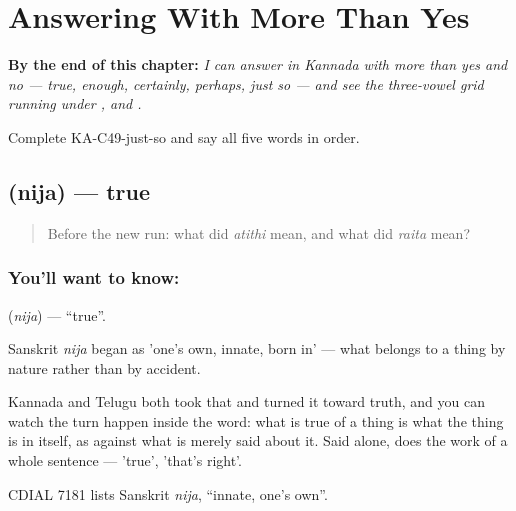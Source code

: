 
\chapter{Answering With More Than Yes}
\label{ch:ka-replies}

\begin{chapteropening}
\textbf{By the end of this chapter:} \emph{I can answer in Kannada with more than yes and no --- true, enough, certainly, perhaps, just so --- and see the three-vowel grid running under ,  and .}

Complete KA-C49-just-so and say all five words in order.
\end{chapteropening}

\section[\texorpdfstring{\kn{ನಿಜ} (nija)}{ನಿಜ (nija)}]{ (nija) — true}

\label{lesson:KA-C49-true}



\begin{quote}
Before the new run: what did \emph{atithi} mean, and what did \emph{raita} mean?
\end{quote}

\subsection*{You'll want to know: }
\textbf{} (\emph{nija}) — \textquotedblleft{}true\textquotedblright{}.

Sanskrit \emph{nija} began as 'one's own, innate, born in' — what belongs to a thing by nature rather than by accident.

Kannada and Telugu both took that and turned it toward truth, and you can watch the turn happen inside the word: what is true of a thing is what the thing is in itself, as against what is merely said about it. Said alone,  does the work of a whole sentence — 'true', 'that's right'.

CDIAL 7181 lists Sanskrit \emph{nija}, \textquotedblleft{}innate, one's own\textquotedblright{}.

